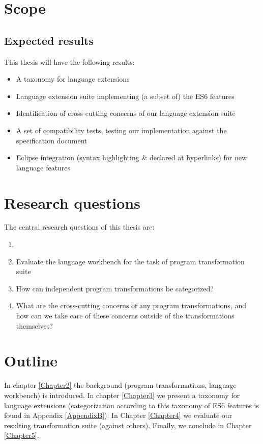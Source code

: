 \section{Scope}

\subsection{Expected results}
This thesis will have the following results:
\begin{itemize}
	\item A taxonomy for language extensions
	\item Language extension suite implementing (a subset of) the ES6 features
	\item Identification of cross-cutting concerns of our language extension suite
	\item A set of compatibility tests, testing our implementation against the specification document
	\item Eclipse integration (syntax highlighting \& declared at hyperlinks) for new language features
\end{itemize}
\section{Research questions}
The central research questions of this thesis are:

\begin{enumerate}
	\item 
	\item Evaluate the language workbench for the task of program transformation suite
	\item How can independent program transformations be categorized?
	\item What are the cross-cutting concerns of any program transformations, and how can we take care of these concerns outside of the transformations themselves?
\end{enumerate}

\section{Outline}
In chapter \ref{Chapter2} the background (program transformations, language workbench) is introduced. In chapter \ref{Chapter3} we present a taxonomy for language extensions (categorization according to this taxonomy of ES6 features is found in Appendix \ref{AppendixB}). In Chapter \ref{Chapter4} we evaluate our resulting transformation suite (against others). Finally, we conclude in Chapter \ref{Chapter5}.